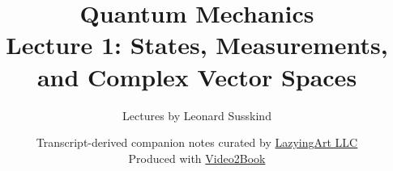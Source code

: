 \documentclass[11pt,oneside]{book}
\begin{document}
\hypersetup{pageanchor=false}
\frontmatter
\title{Quantum Mechanics\\[0.45em]
\large Lecture 1: States, Measurements, and Complex Vector Spaces}
\author{Lectures by Leonard Susskind}
\date{Transcript-derived companion notes curated by
\href{https://lazying.art}{LazyingArt LLC}\\[0.35em]
\small Produced with
\href{https://github.com/lachlanchen/Video2Book}{Video2Book}}
\maketitle
\hypersetup{pageanchor=true}
\mainmatter

\end{document}
